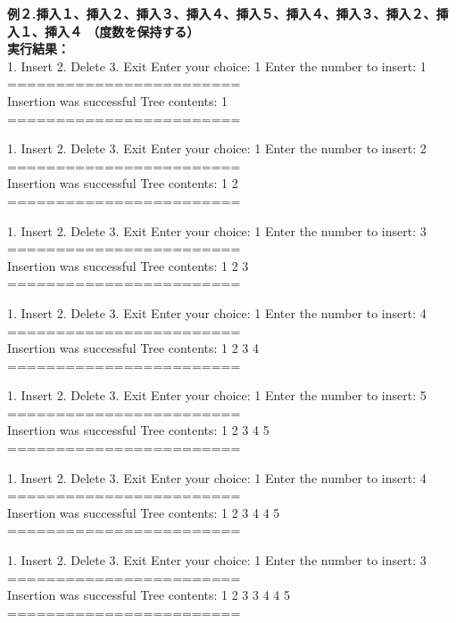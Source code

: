 \documentclass[]{jsarticle}
\begin{document}
\noindent\textbf{例２.挿入１、挿入２、挿入３、挿入４、挿入５、挿入４、挿入３、挿入２、挿入１、挿入４ （度数を保持する）}\\
\textbf{実行結果：}\\
1. Insert
2. Delete
3. Exit
Enter your choice:  1
Enter the number to insert: 1\\
========================\\
Insertion was successful
Tree contents: 1 \\
========================

1. Insert
2. Delete
3. Exit
Enter your choice: 1
Enter the number to insert: 2\\
========================\\
Insertion was successful
Tree contents: 1 2 \\
========================

1. Insert
2. Delete
3. Exit
Enter your choice: 1
Enter the number to insert: 3\\
========================\\
Insertion was successful
Tree contents: 1 2 3 \\
========================

1. Insert
2. Delete
3. Exit
Enter your choice: 1
Enter the number to insert: 4\\
========================\\
Insertion was successful
Tree contents: 1 2 3 4 \\
========================

1. Insert
2. Delete
3. Exit
Enter your choice: 1
Enter the number to insert: 5\\
========================\\
Insertion was successful
Tree contents: 1 2 3 4 5 \\
========================

1. Insert
2. Delete
3. Exit
Enter your choice: 1
Enter the number to insert: 4\\
========================\\
Insertion was successful
Tree contents: 1 2 3 4 4 5\\ 
========================

1. Insert
2. Delete
3. Exit
Enter your choice: 1
Enter the number to insert: 3\\
========================\\
Insertion was successful
Tree contents: 1 2 3 3 4 4 5 \\
========================
\end{document}
